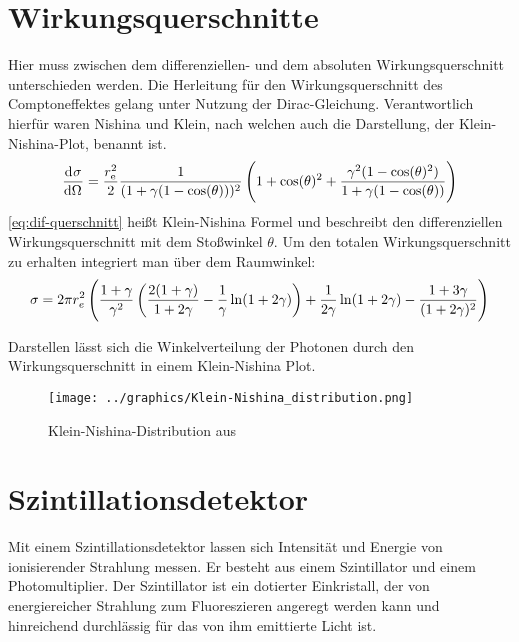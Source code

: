 \documentclass[11pt, ngerman, fleqn, DIV=15, headinclude, BCOR=2cm]{scrreprt}
\begin{document}
\section{Wirkungsquerschnitte}
Hier muss zwischen dem differenziellen- und dem absoluten Wirkungsquerschnitt
unterschieden werden.
Die Herleitung für den Wirkungsquerschnitt des Comptoneffektes gelang unter
Nutzung der Dirac-Gleichung. Verantwortlich hierfür waren Nishina und
Klein, nach welchen auch die Darstellung, der Klein-Nishina-Plot, benannt ist.
\[
    \dod \sigma\Omega = \frac{r^2_\text{e}}{2}
    \frac{1}{(1+\gamma(1-\cos(\theta)))^2}\del{1+\cos(\theta)^2+\frac{\gamma^2(1-\cos(\theta)^2)}{1+\gamma(1-\cos(\theta))}}
\]
\label{eq:dif-querschnitt}
\ref{eq:dif-querschnitt} heißt Klein-Nishina Formel und beschreibt den
differenziellen Wirkungsquerschnitt mit dem Stoßwinkel $\theta$.
Um den totalen Wirkungsquerschnitt zu erhalten integriert man über dem
Raumwinkel:
\[
    \sigma = 2\pi r^2_e
    \del{\frac{1+\gamma}{\gamma^2}\del{\frac{2(1+\gamma)}{1+2\gamma}-\frac
        1\gamma\ln(1+2\gamma)}+\frac
    1{2\gamma}\ln(1+2\gamma)-\frac{1+3\gamma}{(1+2\gamma)^2}}
\]

Darstellen lässt sich die Winkelverteilung der Photonen durch den Wirkungsquerschnitt in einem
Klein-Nishina Plot. 

\begin{figure}
	\centering
	\texttt{[image: ../graphics/Klein-Nishina\_distribution.png]}
	\caption{%
		Klein-Nishina-Distribution aus \parencite{klein-nishina}
	}
\end{figure}

\section{Szintillationsdetektor}
Mit einem Szintillationsdetektor lassen sich Intensität und Energie von
ionisierender Strahlung messen.
Er besteht aus einem Szintillator und einem Photomultiplier.
Der Szintillator ist ein dotierter Einkristall, der von energiereicher
Strahlung zum Fluoreszieren angeregt werden kann und hinreichend
durchlässig für das von ihm emittierte Licht ist.
\end{document}
